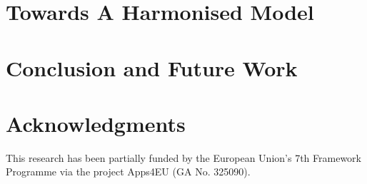 \documentclass[runningheads,a4paper]{llncs}
\begin{document}

\section{Towards A Harmonised Model}
\label{sec:hdl}


\section{Conclusion and Future Work}
\label{sec:conclusion}


\section*{Acknowledgments}
This research has been partially funded by the European Union's 7th Framework Programme via the project Apps4EU (GA No. 325090).
\vspace{0.5cm}


\nocite{*}

\end{document}
